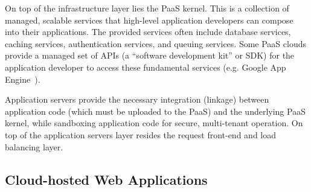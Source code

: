 On top of the infrastructure layer lies the PaaS kernel. This is a collection of managed, scalable
services that high-level application developers can compose into their applications. The provided services
often include database services, caching services, authentication services,
and queuing services.
Some PaaS clouds
provide a managed set of APIs (a ``software development
kit'' or SDK) for the application developer to access these fundamental
services (e.g. Google App Engine~\cite{gae}). 

Application servers
provide the necessary integration (linkage) between application code (which
must be uploaded to the PaaS) and the
underlying PaaS kernel, while sandboxing application code for secure, multi-tenant operation. 
On top
of the application servers layer resides the request
front-end and load balancing layer. 



\subsection{Cloud-hosted Web Applications} 


